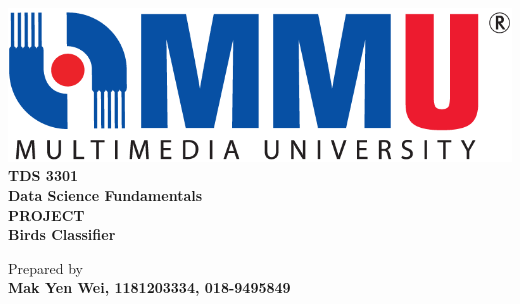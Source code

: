 \documentclass[12pt,a4paper,oneside]{article}
\begin{document}
\begin{sloppypar}

\begin{center}

\includegraphics[scale=0.30]{mmu.png}\\
\vspace{1cm}
\Large{\textbf{TDS 3301 \\Data Science Fundamentals}} \\
\vspace{2.5cm}
\Large{\textbf{PROJECT}} \\
\vspace{2.5cm}
 \Large{\textbf{Birds Classifier}} \\


\vspace{8.5cm}


\normalsize{Prepared by} \\
\vspace{2.5cm}
\large{\textbf{Mak Yen Wei, 1181203334, 018-9495849}} \\


\end{center}

\thispagestyle{empty}

\clearpage 

  





\end{sloppypar}
\end{document}

